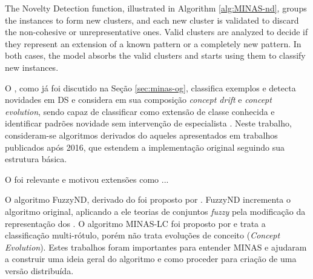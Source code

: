 The Novelty Detection function, illustrated in Algorithm \ref{alg:MINAS-nd},
groups the instances to form new clusters, and each new cluster is validated to
discard the non-cohesive or unrepresentative ones.
Valid clusters are analyzed to decide if they represent an extension of a
known pattern or a completely new pattern. In both cases, the model absorbs the
valid clusters and starts using them to classify new instances.

O \minas, como já foi discutido na Seção \ref{sec:minas-og}, classifica
exemplos e detecta
novidades em DS e considera em sua composição \emph{concept drift} e
\emph{concept evolution}, sendo capaz de classificar como extensão de classe
conhecida e identificar padrões novidade sem intervenção de especialista
\cite{Faria2016minas}.
Neste trabalho, consideram-se algoritmos derivados do \minas
aqueles apresentados em trabalhos publicados após 2016, que estendem a
implementação original seguindo sua estrutura básica.

O \minas foi relevante e motivou extensões como \cite{DaSilva2018,Costa2019}...

O algoritmo FuzzyND, derivado do \minas foi proposto por .
FuzzyND incrementa o algoritmo original, aplicando a ele teorias de
conjuntos \emph{fuzzy} pela modificação da representação dos \clusters.
O algoritmo MINAS-LC foi proposto por  e trata a
classificação multi-rótulo, porém não trata evoluções de conceito (\emph{Concept
Evolution}).
Estes trabalhos foram importantes para entender MINAS e ajudaram a construir uma
ideia geral do algoritmo e como proceder para criação de uma versão distribuída.




